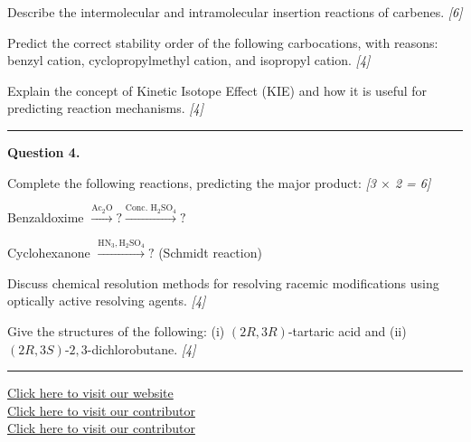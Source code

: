 \documentclass[11pt,a4paper]{article}
\newcommand{\pts}[1]{\hfill   \textit{[#1]}}
\begin{document}
\begin{parts}
  \item Describe the intermolecular and intramolecular insertion reactions of carbenes. \pts{6}
  \item Predict the correct stability order of the following carbocations, with reasons: benzyl cation, cyclopropylmethyl cation, and isopropyl cation. \pts{4}
  \item Explain the concept of Kinetic Isotope Effect (KIE) and how it is useful for predicting reaction mechanisms. \pts{4}
\end{parts}

\medskip\rule{\linewidth}{0.2pt}




\noindent   \textbf{Question 4.}

\begin{parts}
  \item Complete the following reactions, predicting the major product: \pts{3 $ \times$ 2 = 6}
  
\begin{parts}
    \item Benzaldoxime $\xrightarrow{ \text{Ac}_2 \text{O}} ? \xrightarrow{ \text{Conc. H}_2 \text{SO}_4} ?$
    \item Cyclohexanone $\xrightarrow{ \text{HN}_3,  \text{H}_2 \text{SO}_4} ?$ (Schmidt reaction)
  \end{parts}
  \item Discuss chemical resolution methods for resolving racemic modifications using optically active resolving agents. \pts{4}
  \item Give the structures of the following: (i) $(2R,3R)$-tartaric acid and (ii) $(2R,3S)$-$2,3$-dichlorobutane. \pts{4}
\end{parts}

\vfill
\rule{\linewidth}{0.4pt}

\begin{center}\small
  \href{https://bhu-exam.vercel.app/}{Click here to visit our website}\\[4pt]
  \href{https://me-aryan.vercel.app/}{Click here to visit our contributor}\\[4pt]
  \href{https://quashan-me.vercel.app/}{Click here to visit our contributor}
\end{center}
\end{document}
